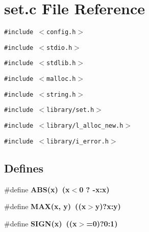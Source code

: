 \section{set.c File Reference}
\label{set_8c}
{\tt \#include $<$config.h$>$}\par
{\tt \#include $<$stdio.h$>$}\par
{\tt \#include $<$stdlib.h$>$}\par
{\tt \#include $<$malloc.h$>$}\par
{\tt \#include $<$string.h$>$}\par
{\tt \#include $<$library/set.h$>$}\par
{\tt \#include $<$library/l\_\-alloc\_\-new.h$>$}\par
{\tt \#include $<$library/i\_\-error.h$>$}\par
\subsection*{Defines}
\begin{CompactItemize}
\item 
\#define \bf{ABS}(x)~(x$<$0 ? -x:x)
\item 
\#define \bf{MAX}(x, y)~((x$>$y)?x:y)
\item 
\#define \bf{SIGN}(x)~((x$>$=0)?0:1)
\end{CompactItemize}
